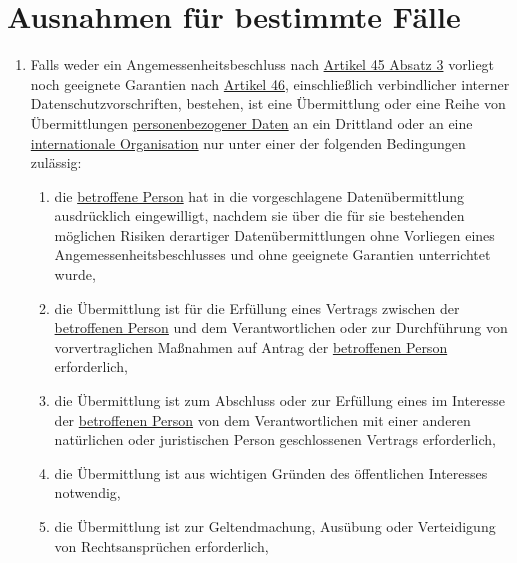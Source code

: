 \chapter{Ausnahmen für bestimmte Fälle}
\label{ch:49}


\begin{enumerate}

  \item Falls weder ein Angemessenheitsbeschluss nach \hyperref[itm:45-3]{Artikel 45 Absatz 3} vorliegt noch geeignete
   Garantien nach \hyperref[ch:46]{Artikel 46}, einschließlich verbindlicher interner Datenschutzvorschriften,
   bestehen, ist eine Übermittlung oder eine Reihe von Übermittlungen \hyperref[itm:04-1]{personenbezogener Daten} an ein Drittland oder an
   eine \hyperref[itm:04-29]{internationale Organisation} nur unter einer der folgenden Bedingungen zulässig:
  \label{itm:49-1-1}

  \begin{enumerate}
  
    \item die \hyperref[itm:04-1]{betroffene Person} hat in die vorgeschlagene Datenübermittlung ausdrücklich eingewilligt, nachdem sie über
     die für sie bestehenden möglichen Risiken derartiger Datenübermittlungen ohne Vorliegen eines
     Angemessenheitsbeschlusses und ohne geeignete Garantien unterrichtet wurde,
    \label{itm:49-1-1a}

    \item die Übermittlung ist für die Erfüllung eines Vertrags zwischen der \hyperref[itm:04-1]{betroffenen Person} und dem Verantwortlichen
     oder zur Durchführung von vorvertraglichen Maßnahmen auf Antrag der \hyperref[itm:04-1]{betroffenen Person} erforderlich,
    \label{itm:49-1-1b}

    \item die Übermittlung ist zum Abschluss oder zur Erfüllung eines im Interesse der \hyperref[itm:04-1]{betroffenen Person} von dem
     Verantwortlichen mit einer anderen natürlichen oder juristischen Person geschlossenen Vertrags erforderlich,
    \label{itm:49-1-1c}

    \item die Übermittlung ist aus wichtigen Gründen des öffentlichen Interesses notwendig,
    \label{itm:49-1-1d}

    \item die Übermittlung ist zur Geltendmachung, Ausübung oder Verteidigung von Rechtsansprüchen erforderlich,
    \label{itm:49-1-1e}


\end{enumerate}
\end{enumerate}
